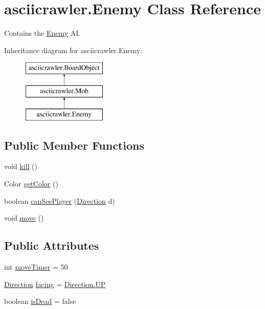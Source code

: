 \hypertarget{classasciicrawler_1_1Enemy}{}\section{asciicrawler.\+Enemy Class Reference}
\label{classasciicrawler_1_1Enemy}


Contains the \hyperlink{classasciicrawler_1_1Enemy}{Enemy} AI.  


Inheritance diagram for asciicrawler.\+Enemy\+:\begin{figure}[H]
\begin{center}
\leavevmode
\includegraphics[height=3.000000cm]{classasciicrawler_1_1Enemy}
\end{center}
\end{figure}
\subsection*{Public Member Functions}
\begin{DoxyCompactItemize}
\item 
void \hyperlink{classasciicrawler_1_1Enemy_afe6ebef5eeb864014ca199659b075d49}{kill} ()
\item 
Color \hyperlink{classasciicrawler_1_1Enemy_a86551f4c55693124ea420002af778fdc}{get\+Color} ()
\item 
boolean \hyperlink{classasciicrawler_1_1Enemy_a278cb592e872c27a9faa8932f1c14819}{can\+See\+Player} (\hyperlink{enumasciicrawler_1_1Direction}{Direction} d)
\item 
void \hyperlink{classasciicrawler_1_1Enemy_afde325bd1c572dd3ff925b335be6ab0e}{move} ()
\end{DoxyCompactItemize}
\subsection*{Public Attributes}
\begin{DoxyCompactItemize}
\item 
int \hyperlink{classasciicrawler_1_1Enemy_a4521663e829959a7c25327925b8a8f40}{move\+Timer} = 50
\item 
\hyperlink{enumasciicrawler_1_1Direction}{Direction} \hyperlink{classasciicrawler_1_1Enemy_ab2fc6a3c9949c3d4317549f84a061ab9}{facing} = \hyperlink{enumasciicrawler_1_1Direction_a6ddc24b03c5e790038cb48cf48ed8bb0}{Direction.\+UP}
\item 
boolean \hyperlink{classasciicrawler_1_1Enemy_aed37076b976c543c6099e7a4199c8a18}{is\+Dead} = false
\end{DoxyCompactItemize}
